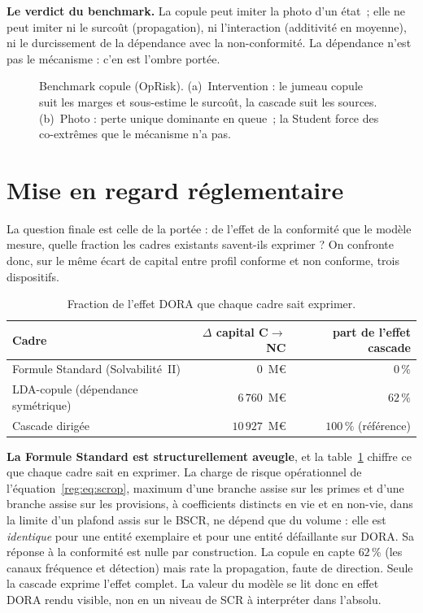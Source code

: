 \begin{cle}
\textbf{Le verdict du benchmark.} La copule peut imiter la photo d'un état~; elle ne
peut imiter ni le surcoût (propagation), ni l'interaction (additivité en moyenne), ni le
durcissement de la dépendance avec la non-conformité. La dépendance n'est pas le
mécanisme : c'en est l'ombre portée.
\end{cle}

\begin{figure}[htbp]\centering
{}
\caption{Benchmark copule (OpRisk). (a)~Intervention : le jumeau copule suit les marges et
sous-estime le surcoût, la cascade suit les sources. (b)~Photo : perte unique dominante en
queue~; la Student force des co-extrêmes que le mécanisme n'a pas.}
\label{fig:benchmark}
\end{figure}

\section{Mise en regard réglementaire}
\label{sec:regard-reglementaire}

La question finale est celle de la portée : de l'effet de la conformité que le modèle
mesure, quelle fraction les cadres existants savent-ils exprimer ? On confronte donc, sur
le même écart de capital entre profil conforme et non conforme, trois dispositifs.

\begin{table}[htbp]\centering\small
\renewcommand{\arraystretch}{1.25}
\begin{tabular}{@{}l r r@{}}
\toprule
\textbf{Cadre} & \textbf{$\Delta$ capital C$\to$NC} & \textbf{part de l'effet cascade} \\
\midrule
Formule Standard (Solvabilité~II) & $0$~M\euro{} & $0\,\%$ \\
LDA-copule (dépendance symétrique) & $6\,760$~M\euro{} & $62\,\%$ \\
Cascade dirigée & $10\,927$~M\euro{} & $100\,\%$ (référence) \\
\bottomrule
\end{tabular}
\caption{Fraction de l'effet DORA que chaque cadre sait exprimer.}
\label{tab:benchmark-sf}
\end{table}

\textbf{La Formule Standard est structurellement aveugle}, et la table~\ref{tab:benchmark-sf}
chiffre ce que chaque cadre sait en exprimer. La charge de risque opérationnel
de l'équation~\eqref{reg:eq:scrop}, maximum d'une branche assise sur les primes et d'une branche
assise sur les provisions, à coefficients distincts en vie et en non-vie, dans la limite d'un
plafond assis sur le BSCR, ne dépend que du volume : elle est \emph{identique} pour une entité
exemplaire et pour une entité défaillante sur DORA. Sa réponse à la conformité est nulle par
construction. La copule en capte $62\,\%$ (les canaux fréquence et détection) mais rate la
propagation, faute de direction. Seule la cascade exprime l'effet complet. La valeur du
modèle se lit donc en effet DORA rendu visible, non en un niveau de SCR à
interpréter dans l'absolu.

